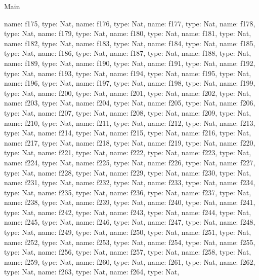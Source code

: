 \begin{lexlean}{Main}
\begin{semanticmodule}
{    {name: f175, type: Nat},
    {name: f176, type: Nat},
    {name: f177, type: Nat},
    {name: f178, type: Nat},
    {name: f179, type: Nat},
    {name: f180, type: Nat},
    {name: f181, type: Nat},
    {name: f182, type: Nat},
    {name: f183, type: Nat},
    {name: f184, type: Nat},
    {name: f185, type: Nat},
    {name: f186, type: Nat},
    {name: f187, type: Nat},
    {name: f188, type: Nat},
    {name: f189, type: Nat},
    {name: f190, type: Nat},
    {name: f191, type: Nat},
    {name: f192, type: Nat},
    {name: f193, type: Nat},
    {name: f194, type: Nat},
    {name: f195, type: Nat},
    {name: f196, type: Nat},
    {name: f197, type: Nat},
    {name: f198, type: Nat},
    {name: f199, type: Nat},
    {name: f200, type: Nat},
    {name: f201, type: Nat},
    {name: f202, type: Nat},
    {name: f203, type: Nat},
    {name: f204, type: Nat},
    {name: f205, type: Nat},
    {name: f206, type: Nat},
    {name: f207, type: Nat},
    {name: f208, type: Nat},
    {name: f209, type: Nat},
    {name: f210, type: Nat},
    {name: f211, type: Nat},
    {name: f212, type: Nat},
    {name: f213, type: Nat},
    {name: f214, type: Nat},
    {name: f215, type: Nat},
    {name: f216, type: Nat},
    {name: f217, type: Nat},
    {name: f218, type: Nat},
    {name: f219, type: Nat},
    {name: f220, type: Nat},
    {name: f221, type: Nat},
    {name: f222, type: Nat},
    {name: f223, type: Nat},
    {name: f224, type: Nat},
    {name: f225, type: Nat},
    {name: f226, type: Nat},
    {name: f227, type: Nat},
    {name: f228, type: Nat},
    {name: f229, type: Nat},
    {name: f230, type: Nat},
    {name: f231, type: Nat},
    {name: f232, type: Nat},
    {name: f233, type: Nat},
    {name: f234, type: Nat},
    {name: f235, type: Nat},
    {name: f236, type: Nat},
    {name: f237, type: Nat},
    {name: f238, type: Nat},
    {name: f239, type: Nat},
    {name: f240, type: Nat},
    {name: f241, type: Nat},
    {name: f242, type: Nat},
    {name: f243, type: Nat},
    {name: f244, type: Nat},
    {name: f245, type: Nat},
    {name: f246, type: Nat},
    {name: f247, type: Nat},
    {name: f248, type: Nat},
    {name: f249, type: Nat},
    {name: f250, type: Nat},
    {name: f251, type: Nat},
    {name: f252, type: Nat},
    {name: f253, type: Nat},
    {name: f254, type: Nat},
    {name: f255, type: Nat},
    {name: f256, type: Nat},
    {name: f257, type: Nat},
    {name: f258, type: Nat},
    {name: f259, type: Nat},
    {name: f260, type: Nat},
    {name: f261, type: Nat},
    {name: f262, type: Nat},
    {name: f263, type: Nat},
    {name: f264, type: Nat},
}
\end{semanticmodule}
\end{lexlean}
